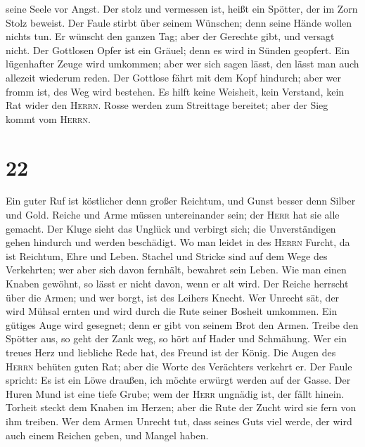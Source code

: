 seine Seele vor Angst.  Der stolz und vermessen ist,
heißt ein Spötter, der im Zorn Stolz beweist.  Der Faule
stirbt über seinem Wünschen; denn seine Hände wollen nichts tun.
 Er wünscht den ganzen Tag; aber der Gerechte gibt, und
versagt nicht.  Der Gottlosen Opfer ist ein Gräuel; denn
es wird in Sünden geopfert.  Ein lügenhafter Zeuge wird
umkommen; aber wer sich sagen lässt, den lässt man auch allezeit
wiederum reden.  Der Gottlose fährt mit dem Kopf
hindurch; aber wer fromm ist, des Weg wird bestehen.  Es
hilft keine Weisheit, kein Verstand, kein Rat wider den \textsc{Herrn}.
 Rosse werden zum Streittage bereitet; aber der Sieg
kommt vom \textsc{Herrn}.

\hypertarget{section-21}{%
\section{22}\label{section-21}}

 Ein guter Ruf ist köstlicher denn großer Reichtum, und
Gunst besser denn Silber und Gold.  Reiche und Arme müssen
untereinander sein; der \textsc{Herr} hat sie alle gemacht.
 Der Kluge sieht das Unglück und verbirgt sich; die
Unverständigen gehen hindurch und werden beschädigt.  Wo
man leidet in des \textsc{Herrn} Furcht, da ist Reichtum, Ehre und
Leben.  Stachel und Stricke sind auf dem Wege des
Verkehrten; wer aber sich davon fernhält, bewahret sein Leben.
 Wie man einen Knaben gewöhnt, so lässt er nicht davon,
wenn er alt wird.  Der Reiche herrscht über die Armen; und
wer borgt, ist des Leihers Knecht.  Wer Unrecht sät, der
wird Mühsal ernten und wird durch die Rute seiner Bosheit umkommen.
 Ein gütiges Auge wird gesegnet; denn er gibt von seinem
Brot den Armen.  Treibe den Spötter aus, so geht der Zank
weg, so hört auf Hader und Schmähung.  Wer ein treues
Herz und liebliche Rede hat, des Freund ist der König. 
Die Augen des \textsc{Herrn} behüten guten Rat; aber die Worte des
Verächters verkehrt er.  Der Faule spricht: Es ist ein
Löwe draußen, ich möchte erwürgt werden auf der Gasse. 
Der Huren Mund ist eine tiefe Grube; wem der \textsc{Herr} ungnädig ist,
der fällt hinein.  Torheit steckt dem Knaben im Herzen;
aber die Rute der Zucht wird sie fern von ihm treiben. 
Wer dem Armen Unrecht tut, dass seines Guts viel werde, der wird auch
einem Reichen geben, und Mangel haben.

